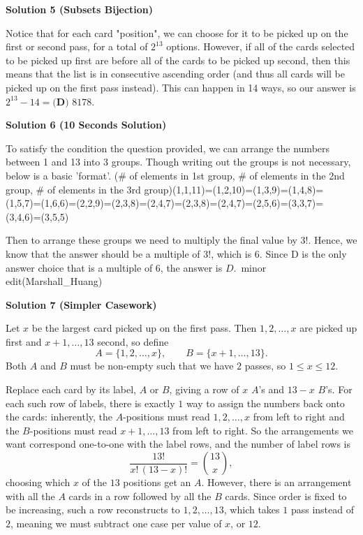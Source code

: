 \begin{enumerate}
 



\textbf{Solution 5 (Subsets Bijection)}

Notice that for each card "position", we can choose for it to be picked up on the first or second pass, for a total of $2^{13}$ options. However, if all of the cards selected to be picked up first are before all of the cards to be picked up second, then this means that the list is in consecutive ascending order (and thus all cards will be picked up on the first pass instead). This can happen in 14 ways, so our answer is $2^{13}-14=\boxed{\textbf{(D) } 8178}$.

 



\textbf{Solution 6 (10 Seconds Solution)}

To satisfy the condition the question provided, we can arrange the numbers between 1 and 13 into 3 groups. Though writing out the groups is not necessary, below is a basic 'format'. (\# of elements in 1st group, \# of elements in the 2nd group, \# of elements in the 3rd group)(1,1,11)=(1,2,10)=(1,3,9)=(1,4,8)=(1,5,7)=(1,6,6)=(2,2,9)=(2,3,8)=(2,4,7)=(2,3,8)=(2,4,7)=(2,5,6)=(3,3,7)=(3,4,6)=(3,5,5)

 Then to arrange these groups we need to multiply the final value by 3!. Hence, we know that the answer should be a multiple of 3!, which is 6. Since D is the only answer choice that is a multiple of 6, the answer is $\boxed{D}$.~minor edit(Marshall\_Huang)

 



\textbf{Solution 7 (Simpler Casework)}

Let $x$ be the largest card picked up on the first pass. Then $1, 2, \ldots, x$ are picked up first and $x+1, \ldots, 13$ second, so define
 \[A = \{1, 2, \ldots, x\}, \qquad B = \{x+1, \ldots, 13\}.\]Both $A$ and $B$ must be non-empty such that we have $2$ passes, so $1 \le x \le 12$.

 
Replace each card by its label, $A$ or $B$, giving a row of $x$ $A$'s and $13-x$ $B$'s. For each such row of labels, there is exactly $1$ way to assign the numbers back onto the cards: inherently, the $A$-positions must read $1, 2, \ldots, x$ from left to right and the $B$-positions must read $x+1, \ldots, 13$ from left to right. So the arrangements we want correspond one-to-one with the label rows, and the number of label rows is
 \[\frac{13!}{x!\,(13-x)!} = \binom{13}{x},\]choosing which $x$ of the $13$ positions get an $A$. However, there is an arrangement with all the $A$ cards in a row followed by all the $B$ cards. Since order is fixed to be increasing, such a row reconstructs to $1, 2, \ldots, 13$, which takes $1$ pass instead of $2$, meaning we must subtract one case per value of $x$, or $12$.


\end{enumerate}
